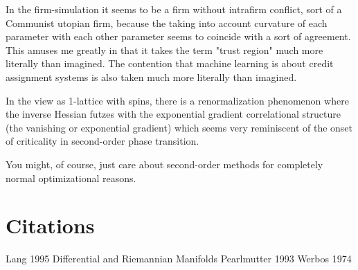 \documentclass{article}
\begin{document}
In the firm-simulation it seems to be a firm without intrafirm conflict, sort of a Communist utopian firm, because the taking into account curvature of each parameter with each other parameter seems to coincide with a sort of agreement. This amuses me greatly in that it takes the term "trust region" much more literally than imagined. The contention that machine learning is about credit assignment systems is also taken much more literally than imagined.

In the view as 1-lattice with spins, there is a renormalization phenomenon where the inverse Hessian futzes with the exponential gradient correlational structure (the vanishing or exponential gradient) which seems very reminiscent of the onset of criticality in second-order phase transition.

You might, of course, just care about second-order methods for completely normal optimizational reasons.

\section{Citations}

Lang 1995 Differential and Riemannian Manifolds
Pearlmutter 1993
Werbos 1974

\end{document}
